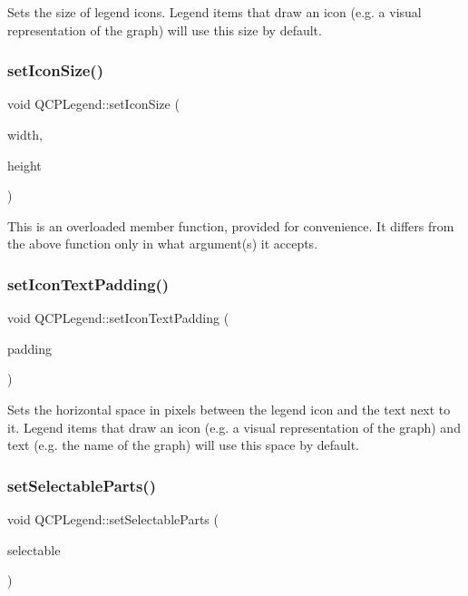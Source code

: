 Sets the size of legend icons. Legend items that draw an icon (e.\+g. a visual representation of the graph) will use this size by default. \mbox{\label{class_q_c_p_legend_a96b1a37fd4ee6a9778e6e54fe56ab6c2}} 
\subsubsection{\texorpdfstring{setIconSize()}{setIconSize()}\hspace{0.1cm}{\footnotesize\ttfamily [2/2]}}
{\footnotesize\ttfamily void Q\+C\+P\+Legend\+::set\+Icon\+Size (\begin{DoxyParamCaption}\item[{int}]{width,  }\item[{int}]{height }\end{DoxyParamCaption})}

This is an overloaded member function, provided for convenience. It differs from the above function only in what argument(s) it accepts. \mbox{\label{class_q_c_p_legend_a62973bd69d5155e8ea3141366e8968f6}} 
\subsubsection{\texorpdfstring{setIconTextPadding()}{setIconTextPadding()}}
{\footnotesize\ttfamily void Q\+C\+P\+Legend\+::set\+Icon\+Text\+Padding (\begin{DoxyParamCaption}\item[{int}]{padding }\end{DoxyParamCaption})}

Sets the horizontal space in pixels between the legend icon and the text next to it. Legend items that draw an icon (e.\+g. a visual representation of the graph) and text (e.\+g. the name of the graph) will use this space by default. \mbox{\label{class_q_c_p_legend_a9ce60aa8bbd89f62ae4fa83ac6c60110}} 
\subsubsection{\texorpdfstring{setSelectableParts()}{setSelectableParts()}}
{\footnotesize\ttfamily void Q\+C\+P\+Legend\+::set\+Selectable\+Parts (\begin{DoxyParamCaption}\item[{const Selectable\+Parts \&}]{selectable }\end{DoxyParamCaption})}

